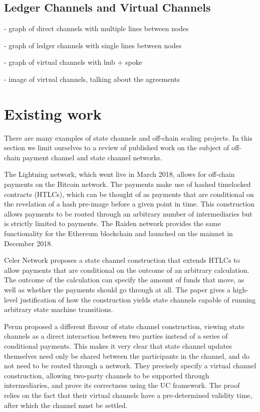 \documentclass{article}
\begin{document}
\subsection{Ledger Channels and Virtual Channels}

- graph of direct channels with multiple lines between nodes

- graph of ledger channels with single lines between nodes

- graph of virtual channels with hub + spoke

- image of virtual channels, talking about the agreements

\section{Existing work}

There are many examples of state channels and off-chain scaling projects. In this section we limit ourselves to a review of published work on the subject of off-chain payment channel and state channel networks.

The Lightning network, which went live in March 2018, allows for off-chain payments on the Bitcoin network.
The payments make use of hashed timelocked contracts (HTLCs), which can be thought of as payments that are conditional on the revelation of a hash pre-image before a given point in time.
This construction allows payments to be routed through an arbitrary number of intermediaries but is strictly limited to payments.
The Raiden network provides the same functionality for the Ethereum blockchain and launched on the mainnet in December 2018.

Celer Network proposes a state channel construction that extends HTLCs to allow payments that are conditional on the outcome of an arbitrary calculation.
The outcome of the calculation can specify the amount of funds that move, as well as whether the payments should go through at all.
The paper gives a high-level justification of how the construction yields state channels capable of running arbitrary state machine transitions.

Perun proposed a different flavour of state channel construction, viewing state channels as a direct interaction between two parties instead of a series of conditional payments.
This makes it very clear that state channel updates themselves need only be shared between the participants in the channel, and do not need to be routed through a network.
They precisely specify a virtual channel construction, allowing two-party channels to be supported through intermediaries, and prove its correctness using the UC framework.
The proof relies on the fact that their virtual channels have a pre-determined validity time, after which the channel must be settled.
\end{document}
